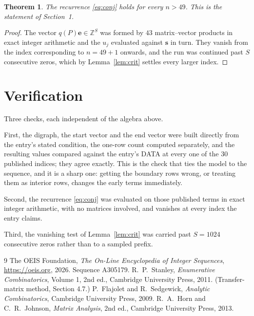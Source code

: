 \documentclass[11pt,a4paper]{article}
\theoremstyle{plain}
\newtheorem{theorem}{Theorem}
\theoremstyle{definition}
\begin{document}
\begin{theorem}
The recurrence \eqref{eq:conj} holds for every $n>49$. This is the statement of
Section~1.
\end{theorem}

\begin{proof}
The vector $q(P)\mathbf{e}\in\mathbb{Z}^{S}$ was formed by $43$ matrix--vector
products in exact integer arithmetic and the $u_j$ evaluated against $\mathbf{s}$ in turn.
They vanish from the index corresponding to $n=49+1$ onwards, and the run was continued
past $S$ consecutive zeros, which by Lemma~\ref{lem:crit} settles every larger index.
\end{proof}

\section{Verification}

Three checks, each independent of the algebra above.

First, the digraph, the start vector and the end vector were built directly from the
entry's stated condition, the one-row count computed separately, and the resulting values
compared against the entry's DATA at every one of the $30$ published indices; they
agree exactly. This is the check that ties the model to the sequence, and it is a sharp one:
getting the boundary rows wrong, or treating them as interior rows, changes the early terms
immediately.

Second, the recurrence \eqref{eq:conj} was evaluated on those published terms in exact
integer arithmetic, with no matrices involved, and vanishes at every index the entry claims.

Third, the vanishing test of Lemma~\ref{lem:crit} was carried past $S=1024$ consecutive
zeros rather than to a sampled prefix.

\begin{thebibliography}{9}
 The OEIS Foundation, \emph{The On-Line Encyclopedia of Integer
Sequences}, \url{https://oeis.org}, 2026. Sequence A305179.
 R.~P.~Stanley, \emph{Enumerative Combinatorics}, Volume 1, 2nd ed.,
Cambridge University Press, 2011. (Transfer-matrix method, Section 4.7.)
 P.~Flajolet and R.~Sedgewick, \emph{Analytic Combinatorics}, Cambridge
University Press, 2009.
 R.~A.~Horn and C.~R.~Johnson, \emph{Matrix Analysis}, 2nd ed., Cambridge
University Press, 2013.
\end{thebibliography}
\end{document}
